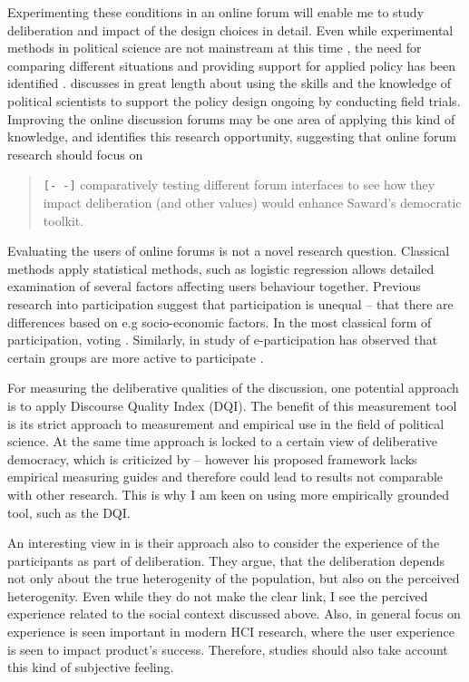 \documentclass[journal,a4paper]{IEEEtran}
\begin{document}
Experimenting these conditions in an online forum will enable me to study deliberation and impact of the design choices in detail. Even while experimental methods in political science are not mainstream at this time \cite{green03,druckman06}, the need for comparing different situations and providing support for applied policy has been identified \cite{stoker10}.  discusses in great length about using the skills and the knowledge of political scientists to support the policy design ongoing by conducting field trials. Improving the online discussion forums may be one area of applying this kind of knowledge, and  identifies this research opportunity, suggesting that online forum research should focus on

\begin{quote}
\texttt{[- -]} comparatively testing different forum interfaces to see how they impact deliberation (and other values) would 
enhance Saward’s democratic toolkit.
\end{quote}

Evaluating the users of online forums is not a novel research question. Classical methods apply statistical methods, such as logistic regression allows detailed examination of several factors affecting users behaviour together. Previous research into participation suggest that participation is unequal -- that there are differences based on e.g socio-economic factors. In the most classical form of participation, voting . Similarly, in study of e-participation has observed that certain groups are more active to participate .

For measuring the deliberative qualities of the discussion, one potential approach is to apply  Discourse Quality Index (DQI). The benefit of this measurement tool is its strict approach to measurement and empirical use in the field of political science. At the same time  approach is locked to a certain view of deliberative democracy, which is criticized by  -- however his proposed framework lacks empirical measuring guides and therefore could lead to results not comparable with other research. This is why I am keen on using more empirically grounded tool, such as the DQI.

An interesting view in  is their approach also to consider the experience of the participants as part of deliberation. They argue, that the deliberation depends not only about the true heterogenity of the population, but also on the perceived heterogenity. Even while they do not make the clear link, I see the percived experience related to the social context discussed above. Also, in general focus on experience is seen important in modern HCI research, where the user experience is seen to impact product's success. Therefore, studies should also take account this kind of subjective feeling.
\end{document}
